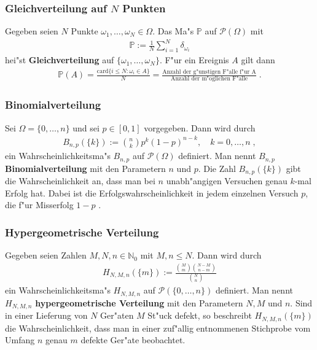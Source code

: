 \documentclass[ngerman,draft,parskip=half,twoside]{scrartcl}
\newcommand*{\N}{\mathbb{N}}      %
\newcommand*{\PotM}{\mathcal{P}}    %
\newcommand*{\WKM}{\mathbb{P}}      %
\begin{document}
\subsubsection{Gleichverteilung auf $N$ Punkten}
Gegeben seien $N$ Punkte $\omega_1,\ldots,\omega_N\in\Omega$.
Das Ma"s $\WKM$ auf $\PotM(\Omega)$ mit
\begin{gather*}
  \WKM:=\frac{1}{N}\sum_{i=1}^N \delta_{\omega_i}
\end{gather*}
hei"st \textbf{Gleichverteilung} auf $\{\omega_1,\ldots,\omega_N\}$. F"ur ein Ereignis $A$ gilt dann
\begin{gather*}
  \WKM(A)=\frac{\mathrm{card}\{ i\le N \colon \omega_i\in A\}}{N}=
     \frac{\mbox{Anzahl der g"unstigen F"alle f"ur A}}{\mbox{Anzahl der m"oglichen F"alle}}\;.
\end{gather*}
\subsubsection{Binomialverteilung}
Sei $\Omega=\{0,\ldots,n\}$ und sei $p\in[0,1]$ vorgegeben. Dann wird durch
\begin{gather*}
  B_{n,p}(\{k\}):={n\choose k} p^k(1-p)^{n-k},\quad k=0,\ldots,n\;,
\end{gather*}
ein Wahrscheinlichkeitsma"s $B_{n,p}$ auf $\PotM(\Omega)$ definiert. Man nennt $B_{n,p}$
\textbf{Binomialverteilung} mit den Parametern $n$ und $p$. Die Zahl
$B_{n,p}(\{k\})$ gibt die Wahrscheinlichkeit an, dass man bei $n$ unabh"angigen Versuchen genau $k$-mal
Erfolg hat. Dabei ist die Erfolgswahrscheinlichkeit in jedem einzelnen Versuch $p$, die f"ur
Misserfolg $1-p$ .
\subsubsection{Hypergeometrische Verteilung}
Gegeben seien Zahlen $M,N,n\in\N_0$ mit $M,n\le N$. Dann wird durch
\begin{gather*}
  H_{N, M ,n}(\{m\}) :=\frac{{M\choose m}{N-M\choose n-m}}{{N\choose n}}
\end{gather*}
ein Wahrscheinlichkeitsma"s $H_{N,M,n}$ auf $\PotM(\{0,\ldots,n\})$
definiert. Man nennt $H_{N,M,n}$  \textbf{hypergeometrische Verteilung} mit den Parametern $N,M$ und $n$.
Sind in einer Lieferung von $N$ Ger"aten $M$ St"uck defekt, so beschreibt $H_{N,M,n}(\{m\})$
die Wahrscheinlichkeit, dass man in einer zuf"allig entnommenen Stichprobe vom Umfang $n$ genau
$m$ defekte Ger"ate beobachtet.
\end{document}
